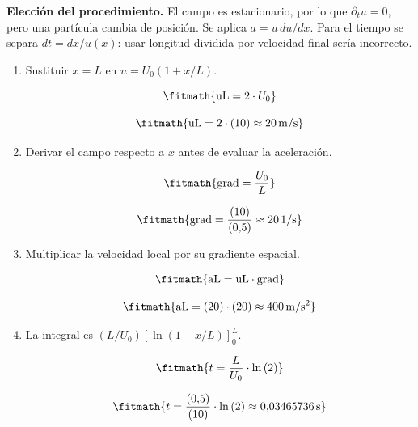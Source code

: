 \noindent\textbf{Elección del procedimiento.} El campo es estacionario, por lo que $\partial_tu=0$, pero una partícula cambia de posición. Se aplica $a=u\,du/dx$. Para el tiempo se separa $dt=dx/u(x)$: usar longitud dividida por velocidad final sería incorrecto.

\begin{enumerate}

\item Sustituir $x=L$ en $u=U_0(1+x/L)$.

\[\fitmath{\mathrm{uL}=2\cdot U_{0}}\]

\[\fitmath{\mathrm{uL}=2\cdot (10)\approx 20\,\mathrm{m/s}}\]

\item Derivar el campo respecto a $x$ antes de evaluar la aceleración.

\[\fitmath{\mathrm{grad}=\frac{U_{0}}{L}}\]

\[\fitmath{\mathrm{grad}=\frac{(10)}{(0{,}5)}\approx 20\,\mathrm{1/s}}\]

\item Multiplicar la velocidad local por su gradiente espacial.

\[\fitmath{\mathrm{aL}=\mathrm{uL}\cdot \mathrm{grad}}\]

\[\fitmath{\mathrm{aL}=(20)\cdot (20)\approx 400\,\mathrm{m/s^{2}}}\]

\item La integral es $(L/U_0)[\ln(1+x/L)]_0^L$.

\[\fitmath{t=\frac{L}{U_{0}}\cdot \ln\left(2\right)}\]

\[\fitmath{t=\frac{(0{,}5)}{(10)}\cdot \ln\left(2\right)\approx 0{,}03465736\,\mathrm{s}}\]

\end{enumerate}
